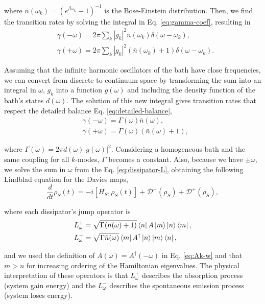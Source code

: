 \noindent where $\bar{n}(\omega_k) = (e^{\beta \omega_k} -1)^{-1}$ is the Bose-Einstein distribution. Then, we find the transition rates by solving the integral in Eq. \eqref{eq:gamma-coef}, resulting in
\begin{align}
    &\gamma (-\omega) = 2\pi \sum_k |g_k|^2 \bar{n}(\omega_k) \delta(\omega - \omega_k),\\
    &\gamma (+\omega) = 2\pi \sum_k |g_k|^2 (\bar{n}(\omega_k) + 1) \delta(\omega - \omega_k).
\end{align}

\noindent Assuming that the infinite harmonic oscillators of the bath have close frequencies, we can convert from discrete to continuum space by transforming the sum into an integral in $\omega$, $g_k$ into a function $g(\omega)$ and including the density function of the bath's states $d(\omega)$. The solution of this new integral gives transition rates that respect the detailed balance Eq. \eqref{eq:detailed-balance},
\begin{align}
    &\gamma (-\omega) = \Gamma (\omega) \bar{n}(\omega),\\
    &\gamma (+\omega) = \Gamma (\omega) (\bar{n}(\omega) + 1),
\end{align}

\noindent where $\Gamma (\omega) = 2\pi d(\omega) |g(\omega)|^2$. Considering a homogeneous bath and the same coupling for all $k$-modes, $\Gamma$ becomes a constant. Also, because we have $\pm \omega$, we solve the sum in $\omega$ from the Eq. \eqref{eq:dissipator-L}, obtaining the following Lindblad equation for the Davies maps,
\begin{equation}
    \frac{d}{dt}{\rho}_S (t) = -i [{H}_S, {\rho}_S (t)] + \mathcal{D}^{-} ({\rho}_S) + \mathcal{D}^{+} ({\rho}_S),
    \label{eq:lindblad-davies}
\end{equation}

\noindent where each dissipator's jump operator is
\begin{align}
    &L_\omega^{+} = \sqrt{\Gamma (\bar{n}(\omega)+1)} \bra{n}{A}\ket{m} \ket{n}\bra{m},
    \label{eq:jump-lindblad+}\\
    &L_\omega^{-} = \sqrt{\Gamma \bar{n}(\omega)} \bra{m}{A}^\dagger\ket{n} \ket{m}\bra{n},
    \label{eq:jump-lindblad-}
\end{align}

\noindent and we used the definition of ${A}(\omega) = {A}^\dagger(-\omega)$ in Eq. \eqref{eq:Ak-w} and that $m>n$ for increasing ordering of the Hamiltonian eigenvalues. The physical interpretation of these operators is that $L_\omega^{+}$ describes the absorption process (system gain energy) and the $L_\omega^{-}$ describes the spontaneous emission process (system loses energy).

